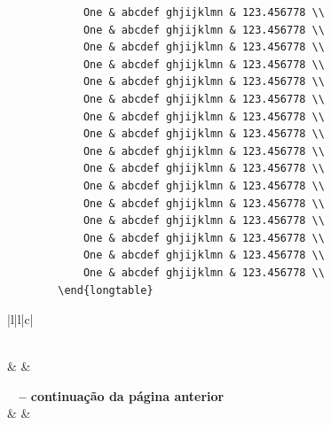 \begin{enumerate}
\begin{verbatim}
			One & abcdef ghjijklmn & 123.456778 \\
			One & abcdef ghjijklmn & 123.456778 \\
			One & abcdef ghjijklmn & 123.456778 \\
			One & abcdef ghjijklmn & 123.456778 \\
			One & abcdef ghjijklmn & 123.456778 \\
			One & abcdef ghjijklmn & 123.456778 \\
			One & abcdef ghjijklmn & 123.456778 \\
			One & abcdef ghjijklmn & 123.456778 \\
			One & abcdef ghjijklmn & 123.456778 \\
			One & abcdef ghjijklmn & 123.456778 \\
			One & abcdef ghjijklmn & 123.456778 \\
			One & abcdef ghjijklmn & 123.456778 \\
			One & abcdef ghjijklmn & 123.456778 \\
			One & abcdef ghjijklmn & 123.456778 \\
			One & abcdef ghjijklmn & 123.456778 \\
			One & abcdef ghjijklmn & 123.456778 \\
		\end{longtable}

	\end{verbatim}	
	
\begin{longtable}{|l|l|c|}
	\caption{Um exemplo de tabela longa.} \label{tab:long} \\
	
	\hline {} &  &  \\ \hline 
	\endfirsthead
	
	{{\bfseries \tablename\ \thetable{} -- continuação da página anterior}} \\
	\hline {} &  &  \\ \hline 
	\endhead
	
	\hline {} \\ \hline
	\endfoot
	
	\hline {} \\
	\endlastfoot
	

\end{longtable}
\end{enumerate}
